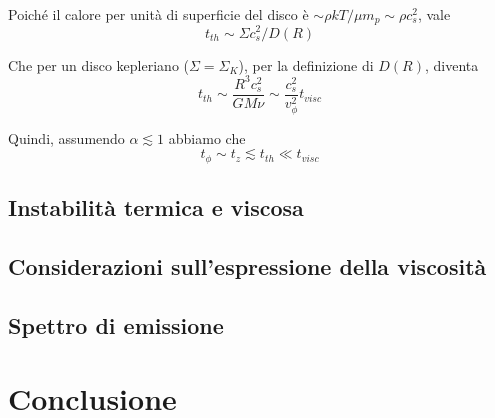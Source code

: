 \documentclass[a4paperbi]{article}
\begin{document}
	Poiché il calore per unità di superficie del disco è $\sim\rho kT/\mu m_p\sim\rho c_s^2$, vale
	\begin{equation*}
		t_{th}\sim\Sigma c_s^2/D(R)
	\end{equation*}
	
	Che per un disco kepleriano ($\Sigma=\Sigma_K$), per la definizione di $D(R)$, diventa
	\begin{equation}
		t_{th}\sim\frac{R^3c_s^2}{GM\nu}\sim\frac{c_s^2}{v_\phi^2}t_{visc}
	\end{equation}
	
	Quindi, assumendo $\alpha\lesssim1$ abbiamo che
	\begin{equation}
		t_\phi\sim t_z\lesssim t_{th}\ll t_{visc}	
	\end{equation}
	
\subsection{Instabilità termica e viscosa}
\subsection{Considerazioni sull'espressione della viscosità}
\subsection{Spettro di emissione}
\newpage
\section{Conclusione}
\end{document}
